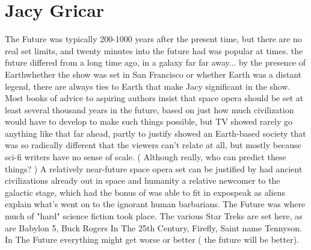 \documentclass[12pt]{book}
\begin{document}
\chapter{Jacy Gricar}

The Future was typically 200-1000 years after the present time, but there are no real set limits, and twenty minutes into the future had was popular at times. the future differed from a long time ago, in a galaxy far far away... by the presence of Earthwhether the show was set in San Francisco or whether Earth was a distant legend, there are always ties to Earth that make Jacy significant in the show. Most books of advice to aspiring authors insist that space opera should be set at least several thousand years in the future, based on just how much civilization would have to develop to make such things possible, but TV showed rarely go anything like that far ahead, partly to justify showed an Earth-based society that was so radically different that the viewers can't relate at all, but mostly because sci-fi writers have no sense of scale. ( Although really, who can predict these things? ) A relatively near-future space opera set can be justified by had ancient civilizations already out in space and humanity a relative newcomer to the galactic stage, which had the bonus of was able to fit in expospeak as aliens explain what's went on to the ignorant human barbarians. The Future was where much of "hard" science fiction took place. The various Star Treks are set here, as are Babylon 5, Buck Rogers In The 25th Century, Firefly, Saint name Tennyson. In The Future everything might get worse or better ( the future will be better).
\end{document}
